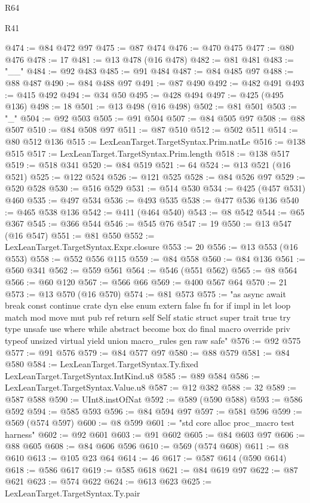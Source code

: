 \begin{lexlean}{R64}
\begin{lexlean}{R41}
\begin{coremodule}
{{{{{{{{{{{{{{{{{{{{{{{{{{{{{{{{{{{{{{{{{{{{{{{{{{{{{{{{{{{{{{{{{{{{{{{{{{{{{{{{{{{{{{{{{@474 := @84 @472 @97
@475 := @87 @474
@476 := @470 @475
@477 := @80 @476
@478 := 17
@481 := @13 @478 (@16 @478)
@482 := @81 @481
@483 := "__"
@484 := @92 @483
@485 := @91 @484
@487 := @84 @485 @97
@488 := @88 @487
@490 := @84 @488 @97
@491 := @87 @490
@492 := @482 @491
@493 := @415 @492
@494 := @34 @50
@495 := @428 @494
@497 := @425 (@495 @136)
@498 := 18
@501 := @13 @498 (@16 @498)
@502 := @81 @501
@503 := "_"
@504 := @92 @503
@505 := @91 @504
@507 := @84 @505 @97
@508 := @88 @507
@510 := @84 @508 @97
@511 := @87 @510
@512 := @502 @511
@514 := @80 @512 @136
@515 := LexLeanTarget.TargetSyntax.Prim.natLe
@516 := @138 @515
@517 := LexLeanTarget.TargetSyntax.Prim.length
@518 := @138 @517
@519 := @518 @341
@520 := @84 @519
@521 := 64
@524 := @13 @521 (@16 @521)
@525 := @122 @524
@526 := @121 @525
@528 := @84 @526 @97
@529 := @520 @528
@530 := @516 @529
@531 := @514 @530
@534 := @425 (@457 @531) @460
@535 := @497 @534
@536 := @493 @535
@538 := @477 @536 @136
@540 := @465 @538 @136
@542 := @411 (@464 @540)
@543 := @8 @542
@544 := @65 @367
@545 := @366 @544
@546 := @545 @76
@547 := 19
@550 := @13 @547 (@16 @547)
@551 := @81 @550
@552 := LexLeanTarget.TargetSyntax.Expr.closure
@553 := 20
@556 := @13 @553 (@16 @553)
@558 := @552 @556 @115
@559 := @84 @558
@560 := @84 @136
@561 := @560 @341
@562 := @559 @561
@564 := @546 (@551 @562)
@565 := @8 @564
@566 := @60 @120
@567 := @566 @66
@569 := @400 @567 @64
@570 := 21
@573 := @13 @570 (@16 @570)
@574 := @81 @573
@575 := "as async await break const continue crate dyn else enum extern false fn for if impl in let loop match mod move mut pub ref return self Self static struct super trait true try type unsafe use where while abstract become box do final macro override priv typeof unsized virtual yield union macro_rules gen raw safe"
@576 := @92 @575
@577 := @91 @576
@579 := @84 @577 @97
@580 := @88 @579
@581 := @84 @580
@584 := LexLeanTarget.TargetSyntax.Ty.fixed LexLeanTarget.TargetSyntax.IntKind.u8
@585 := @89 @584
@586 := LexLeanTarget.TargetSyntax.Value.u8
@587 := @12 @382
@588 := 32
@589 := @587 @588
@590 := UInt8.instOfNat
@592 := @589 (@590 @588)
@593 := @586 @592
@594 := @585 @593
@596 := @84 @594 @97
@597 := @581 @596
@599 := @569 (@574 @597)
@600 := @8 @599
@601 := "std core alloc proc_macro test harness"
@602 := @92 @601
@603 := @91 @602
@605 := @84 @603 @97
@606 := @88 @605
@608 := @84 @606 @596
@610 := @569 (@574 @608)
@611 := @8 @610
@613 := @105 @23 @64
@614 := 46
@617 := @587 @614 (@590 @614)
@618 := @586 @617
@619 := @585 @618
@621 := @84 @619 @97
@622 := @87 @621
@623 := @574 @622
@624 := @613 @623
@625 := LexLeanTarget.TargetSyntax.Ty.pair
}}}}}}}}}}}}}}}}}}}}}}}}}}}}}}}}}}}}}}}}}}}}}}}}}}}}}}}}}}}}}}}}}}}}}}}}}}}}}}}}}}}}}}}}}
\end{coremodule}
\end{lexlean}
\end{lexlean}
